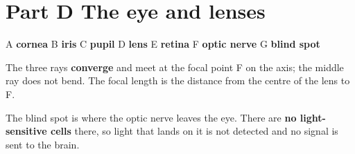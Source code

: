\documentclass[11pt]{article}
\begin{document}
\section*{Part D \quad The eye and lenses}
 A \textbf{cornea} \quad B \textbf{iris} \quad C \textbf{pupil} \quad D \textbf{lens} \quad E \textbf{retina} \quad F \textbf{optic nerve} \quad G \textbf{blind spot}

\begin{minipage}[t]{0.5\textwidth}
\vspace{0pt}
 The three rays \textbf{converge} and meet at the focal point F on the axis; the middle ray does not bend. The focal length is the distance from the centre of the lens to F.
\end{minipage}\hfill
\begin{minipage}[t]{0.46\textwidth}
\vspace{0pt}\centering{}
\end{minipage}

 The blind spot is where the optic nerve leaves the eye. There are \textbf{no light-sensitive cells} there, so light that lands on it is not detected and no signal is sent to the brain.
\end{document}
